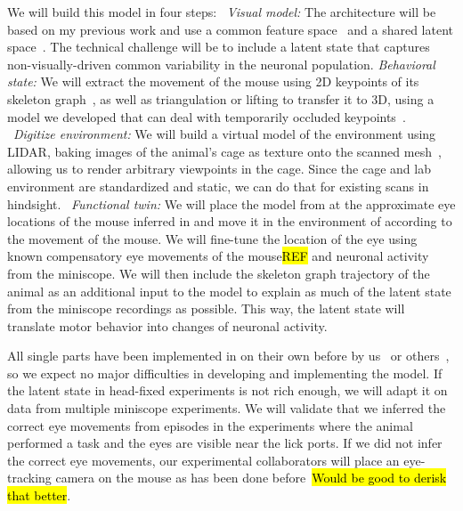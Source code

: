 \documentclass[COG,11pt]{ercgrant}
\begin{document}
 We will build this model in four steps: ~\textit{Visual model:} The architecture will be based on my previous work and use a common feature space~\parencite{Sinz2018-sk} and a shared latent space~\parencite{Bashiri2021-or}. 
The technical challenge will be to include a latent state that captures non-visually-driven common variability in the neuronal population.  \textit{Behavioral state:} We will extract the movement of the mouse using 2D keypoints of its skeleton graph~\parencite{Mathis2018-lk}, as well as triangulation or lifting to transfer it to 3D, using a model we developed that can deal with temporarily occluded keypoints~\parencite{Pierzchlewicz2022-tq}. 
~\textit{Digitize environment:}  We will build a virtual model of the environment using LIDAR, baking images of the animal's cage as texture onto the scanned mesh~\parencite[similar as in][]{Holmgren2021-jv}, allowing us to render arbitrary viewpoints in the cage.
Since the cage and lab environment are standardized and static, we can do that for existing scans in hindsight.
~\textit{Functional twin:} 
We will place the model from  at the approximate eye locations of the mouse inferred in  and move it in the environment of  according to the movement of the mouse. 
We will fine-tune the location of the eye using known compensatory eye movements of the mouse\hl{REF} and neuronal activity from the miniscope.
We will then include the skeleton graph trajectory of the animal as an additional input to the model to explain as much of the latent state from the miniscope recordings as possible. 
This way, the latent state will translate motor behavior into changes of neuronal activity.

 All single parts have been implemented in on their own before by us~\parencite{Sinz2018-sk, Bashiri2021-or} or others~\parencite{Parker2022-ac,Holmgren2021-jv}, so we expect no major difficulties in developing and implementing the model. If the latent state in head-fixed experiments is not rich enough, we will adapt it on data from multiple miniscope experiments. We will validate that we inferred the correct eye movements from episodes in the experiments where the animal performed a task and the eyes are visible near the lick ports. If we did not infer the correct eye movements, our experimental collaborators will place an eye-tracking camera on the mouse as has been done before~\parencite{Parker2022-ac}\hl{Would be good to derisk that better}.
\end{document}
